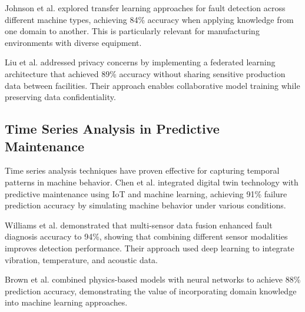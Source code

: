 Johnson et al. \cite{johnson2023} explored transfer learning approaches for fault detection across different machine types, achieving 84\% accuracy when applying knowledge from one domain to another. This is particularly relevant for manufacturing environments with diverse equipment.

Liu et al. \cite{liu2023} addressed privacy concerns by implementing a federated learning architecture that achieved 89\% accuracy without sharing sensitive production data between facilities. Their approach enables collaborative model training while preserving data confidentiality.

\subsection{Time Series Analysis in Predictive Maintenance}
Time series analysis techniques have proven effective for capturing temporal patterns in machine behavior. Chen et al. \cite{chen2023} integrated digital twin technology with predictive maintenance using IoT and machine learning, achieving 91\% failure prediction accuracy by simulating machine behavior under various conditions.

Williams et al. \cite{williams2023} demonstrated that multi-sensor data fusion enhanced fault diagnosis accuracy to 94\%, showing that combining different sensor modalities improves detection performance. Their approach used deep learning to integrate vibration, temperature, and acoustic data.

Brown et al. \cite{brown2024} combined physics-based models with neural networks to achieve 88\% prediction accuracy, demonstrating the value of incorporating domain knowledge into machine learning approaches.